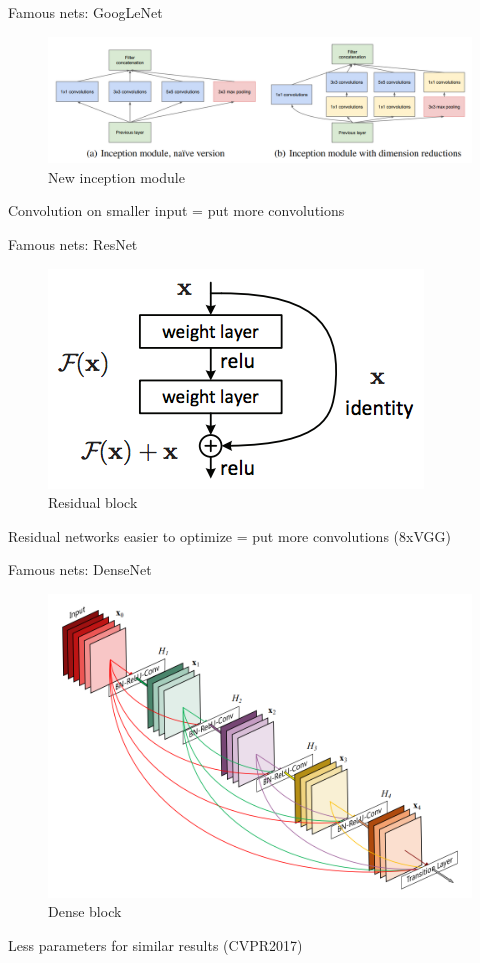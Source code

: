 \begin{frame}{Famous nets: GoogLeNet}

	\begin{figure}
		\includegraphics[width=\linewidth]{images/inception.png}
		\caption{New inception module}
	\end{figure}
	Convolution on smaller input = put more convolutions
	
	
	\cite{INCEPTION}
\end{frame}

\begin{frame}{Famous nets: ResNet}

	\begin{figure}
		\includegraphics[width=0.5\linewidth]{images/resnet.png}
		\caption{Residual block}
	\end{figure}
	Residual networks easier to optimize = put more convolutions (8xVGG)
	
	
	\cite{RESNET}
\end{frame}

\begin{frame}{Famous nets: DenseNet}

	\begin{figure}
		\includegraphics[width=0.5\linewidth]{images/densenet.png}
		\caption{Dense block}
	\end{figure}
	Less parameters for similar results (CVPR2017)
	
	
	\cite{DENSENET}
\end{frame}


